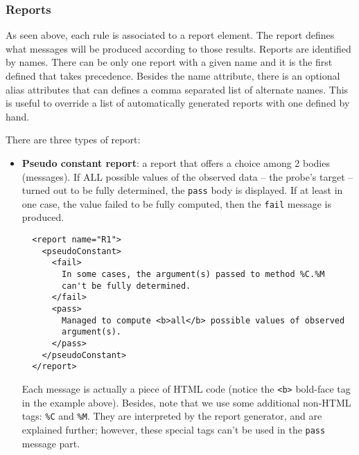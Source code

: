 \subsubsection{Reports}
As seen above, each rule is associated to a report element. The report
defines what messages will be produced according to those
results. 
Reports are identified by names. There can be only one report with a
given name and it is the first defined that takes precedence.
Besides the name attribute, there is an optional alias attributes that
can defines a comma separated list of alternate names. This is useful
to override a list of automatically generated reports with 
one defined by hand.

There are three types of report:

\begin{itemize}
\item{\textbf{Pseudo constant report}}: a report that offers a choice
  among 2 bodies (messages). If ALL possible values of the observed data -- the
  probe's target -- turned out to be fully determined, the
  \texttt{pass} body is displayed. If at least in one case, the value
  failed to be fully computed, then the \texttt{fail} message is
  produced.
\begin{verbatim}
  <report name="R1">
    <pseudoConstant>
      <fail> 
        In some cases, the argument(s) passed to method %C.%M
        can't be fully determined.
      </fail>
      <pass> 
        Managed to compute <b>all</b> possible values of observed 
        argument(s). 
      </pass>
    </pseudoConstant>
  </report>
\end{verbatim}
Each message is actually a piece of HTML code (notice the \texttt{<b>}
bold-face tag in the example above). Besides,  note that we use some
additional non-HTML tags: \texttt{\%C} and \texttt{\%M}. They are
interpreted by the report generator, and are explained further;
however, these special tags can't be used in the \texttt{pass} message
part.


\end{itemize}
